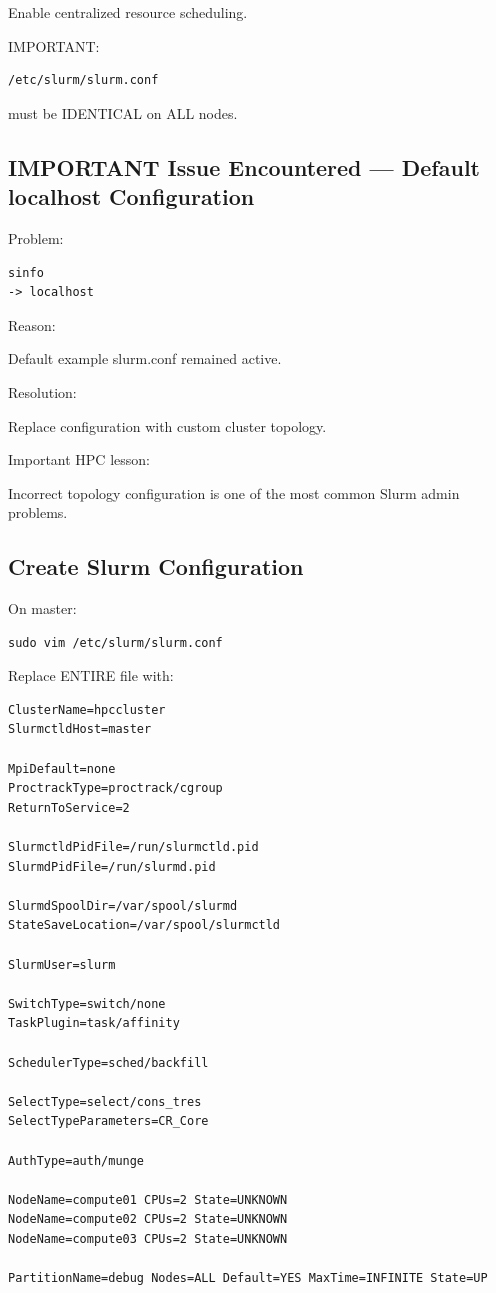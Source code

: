 \documentclass[11pt]{article}
\begin{document}
Enable centralized resource scheduling.

IMPORTANT:

\begin{verbatim}
/etc/slurm/slurm.conf
\end{verbatim}

must be IDENTICAL on ALL nodes.
\subsection{IMPORTANT Issue Encountered — Default localhost Configuration}
\label{sec:org3bd46f6}

Problem:

\begin{verbatim}
sinfo
-> localhost
\end{verbatim}

Reason:

Default example slurm.conf remained active.

Resolution:

Replace configuration with custom cluster topology.

Important HPC lesson:

Incorrect topology configuration is one of the most common Slurm admin problems.
\subsection{Create Slurm Configuration}
\label{sec:org27f8ccb}

On master:

\begin{verbatim}
sudo vim /etc/slurm/slurm.conf
\end{verbatim}

Replace ENTIRE file with:

\begin{verbatim}
ClusterName=hpccluster
SlurmctldHost=master

MpiDefault=none
ProctrackType=proctrack/cgroup
ReturnToService=2

SlurmctldPidFile=/run/slurmctld.pid
SlurmdPidFile=/run/slurmd.pid

SlurmdSpoolDir=/var/spool/slurmd
StateSaveLocation=/var/spool/slurmctld

SlurmUser=slurm

SwitchType=switch/none
TaskPlugin=task/affinity

SchedulerType=sched/backfill

SelectType=select/cons_tres
SelectTypeParameters=CR_Core

AuthType=auth/munge

NodeName=compute01 CPUs=2 State=UNKNOWN
NodeName=compute02 CPUs=2 State=UNKNOWN
NodeName=compute03 CPUs=2 State=UNKNOWN

PartitionName=debug Nodes=ALL Default=YES MaxTime=INFINITE State=UP
\end{verbatim}
\end{document}
